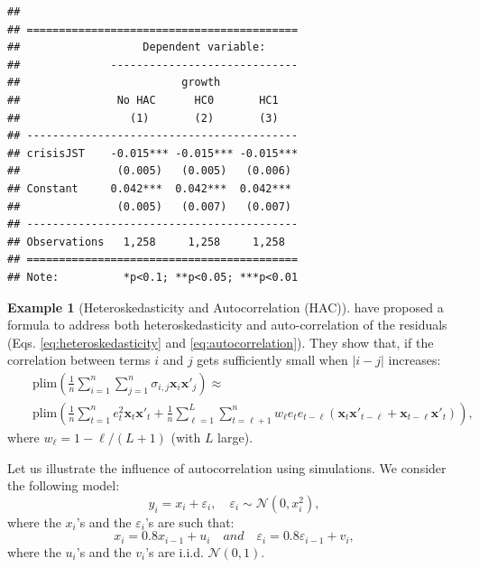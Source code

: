 \documentclass[
  12pt,
]{book}
\theoremstyle{definition}
\theoremstyle{definition}
\newtheorem{example}{Example}[chapter]
\theoremstyle{definition}
\theoremstyle{definition}
\theoremstyle{remark}
\begin{document}
\begin{verbatim}
## 
## ==========================================
##                   Dependent variable:     
##              -----------------------------
##                         growth            
##               No HAC      HC0       HC1   
##                 (1)       (2)       (3)   
## ------------------------------------------
## crisisJST    -0.015*** -0.015*** -0.015***
##               (0.005)   (0.005)   (0.006) 
## Constant     0.042***  0.042***  0.042*** 
##               (0.005)   (0.007)   (0.007) 
## ------------------------------------------
## Observations   1,258     1,258     1,258  
## ==========================================
## Note:          *p<0.1; **p<0.05; ***p<0.01
\end{verbatim}

\begin{example}[Heteroskedasticity and Autocorrelation (HAC)]
\protect\hypertarget{exm:HCheterAC}{}\label{exm:HCheterAC}\citet{Newey_West_1987} have proposed a formula to address both heteroskedasticity and auto-correlation of the residuals (Eqs. \eqref{eq:heteroskedasticity} and \eqref{eq:autocorrelation}). They show that, if the correlation between terms \(i\) and \(j\) gets sufficiently small when \(|i-j|\) increases:
\begin{eqnarray}
&&\mbox{plim} \left( \frac{1}{n}\sum_{i=1}^{n}\sum_{j=1}^{n}\sigma_{i,j}\mathbf{x}_i\mathbf{x}'_j \right) \approx  \\
&&\mbox{plim} \left( \frac{1}{n}\sum_{t=1}^{n}e_{t}^2\mathbf{x}_t\mathbf{x}'_t +
\frac{1}{n}\sum_{\ell=1}^{L}\sum_{t=\ell+1}^{n}w_\ell e_{t}e_{t-\ell}(\mathbf{x}_t\mathbf{x}'_{t-\ell} + \mathbf{x}_{t-\ell}\mathbf{x}'_{t})
\right), \nonumber \label{eq:NW}
\end{eqnarray}
where \(w_\ell = 1 - \ell/(L+1)\) (with \(L\) large).

Let us illustrate the influence of autocorrelation using simulations. We consider the following model:
\begin{equation}
y_i = x_i + \varepsilon_i, \quad \varepsilon_i \sim \mathcal{N}(0,x_i^2),\label{eq:simul11}
\end{equation}
where the \(x_i\)'s and the \(\varepsilon_i\)'s are such that:
\begin{equation}
x_i = 0.8 x_{i-1} + u_i \quad and \quad \varepsilon_i = 0.8 \varepsilon_{i-1} + v_i, \label{eq:simul22}
\end{equation}
where the \(u_i\)'s and the \(v_i\)'s are i.i.d. \(\mathcal{N}(0,1)\).


\end{example}
\end{document}
